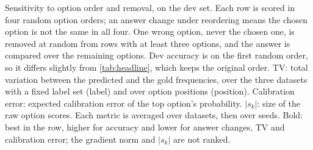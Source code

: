 \begin{table}[t]
  \centering\small
  \caption{Sensitivity to option order and removal, on the dev set. Each row is scored in four random option orders; an
  answer change under reordering means the chosen option is not the same in all four. One wrong option, never the
  chosen one, is removed at random from rows with at least three options, and the answer is compared over the remaining
  options. Dev accuracy is on the first random order, so it differs slightly from \cref{tab:headline}, which keeps
  the original order. TV: total variation between the predicted and the gold frequencies, over the three datasets with
  a fixed label set (label) and over option positions (position). Calibration error: expected calibration error of the
  top option's probability. $|s_k|$: size of the raw option scores. Each metric is averaged over datasets, then over
  seeds. Bold: best in the row, higher for accuracy and lower for answer changes, TV and calibration error; the
  gradient norm and $|s_k|$ are not ranked.}
  \label{tab:coupling}
  
\end{table}
